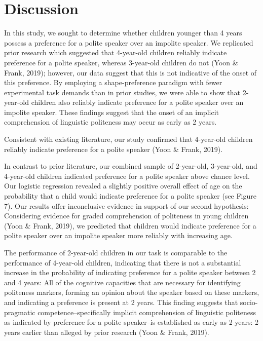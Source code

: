 \documentclass[
  english,
  man,floatsintext]{apa6}
\begin{document}
\newpage

\hypertarget{discussion}{%
\section{Discussion}\label{discussion}}

In this study, we sought to determine whether children younger than 4 years possess a preference for a polite speaker over an impolite speaker. We replicated prior research which suggested that 4-year-old children reliably indicate preference for a polite speaker, whereas 3-year-old children do not (Yoon \& Frank, 2019); however, our data suggest that this is not indicative of the onset of this preference. By employing a shape-preference paradigm with fewer experimental task demands than in prior studies, we were able to show that 2-year-old children also reliably indicate preference for a polite speaker over an impolite speaker. These findings suggest that the onset of an implicit comprehension of linguistic politeness may occur as early as 2 years.

Consistent with existing literature, our study confirmed that 4-year-old children reliably indicate preference for a polite speaker (Yoon \& Frank, 2019).

In contrast to prior literature, our combined sample of 2-year-old, 3-year-old, and 4-year-old children indicated preference for a polite speaker above chance level. Our logistic regression revealed a slightly positive overall effect of age on the probability that a child would indicate preference for a polite speaker (see Figure 7). Our results offer inconclusive evidence in support of our second hypothesis: Considering evidence for graded comprehension of politeness in young children (Yoon \& Frank, 2019), we predicted that children would indicate preference for a polite speaker over an impolite speaker more reliably with increasing age.

The performance of 2-year-old children in our task is comparable to the performance of 4-year-old children, indicating that there is not a substantial increase in the probability of indicating preference for a polite speaker between 2 and 4 years: All of the cognitive capacities that are necessary for identifying politeness markers, forming an opinion about the speaker based on these markers, and indicating a preference is present at 2 years. This finding suggests that socio-pragmatic competence--specifically implicit comprehension of linguistic politeness as indicated by preference for a polite speaker--is established as early as 2 years: 2 years earlier than alleged by prior research (Yoon \& Frank, 2019).
\end{document}
